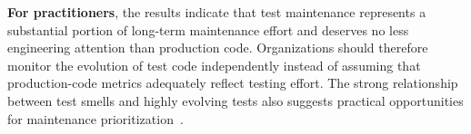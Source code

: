 
\textbf{For practitioners}, the results indicate that test maintenance represents a substantial portion of long-term maintenance effort and deserves no less engineering attention than production code. Organizations should therefore monitor the evolution of test code independently instead of assuming that production-code metrics adequately reflect testing effort. The strong relationship between test smells and highly evolving tests also suggests practical opportunities for maintenance prioritization~\cite{Khomh:2012}.
